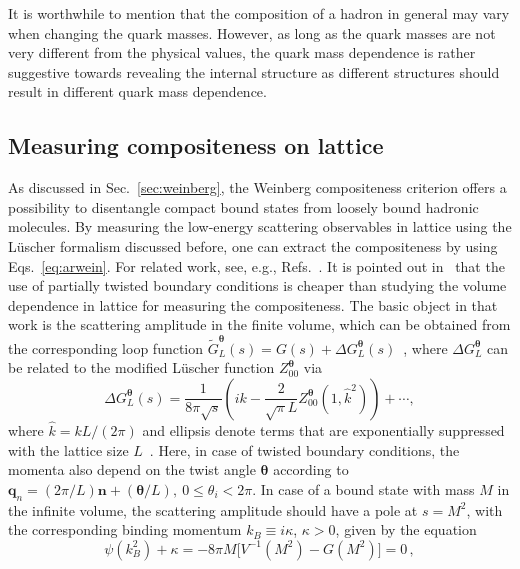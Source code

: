 {It is worthwhile to mention that the composition of a hadron in general
may vary when changing the quark masses. However, as long as the quark masses are
not very different from the physical values, the quark mass dependence is rather
suggestive towards revealing the internal structure as different structures
should result in different quark mass dependence. }

\subsection{Measuring compositeness on lattice}
\label{sec:compo}

As discussed in Sec.~\ref{sec:weinberg}, the Weinberg compositeness criterion
offers a possibility to disentangle compact bound states from loosely bound
hadronic molecules. {By measuring the low-energy scattering observables in
lattice using the L\"uscher formalism discussed before, one can extract the
compositeness by using Eqs.~\eqref{eq:arwein}. For related work, see, e.g.,
Refs.~\cite{Suganuma:2007uv,MartinezTorres:2011pr,Ozaki:2012ce,
Albaladejo:2013aka}. It is pointed out in~\cite{Agadjanov:2014ana} that the use
of partially twisted boundary conditions is cheaper than studying the volume dependence in lattice
for measuring the compositeness.} 
The basic object in that work is the
scattering amplitude in the finite volume, which can be obtained from the
corresponding loop function $\tilde G_L^{\bm{\theta}}(s) = G(s)+\Delta
G_L^{\bm{\theta}}(s)$~\cite{Doring:2011vk}, where $\Delta G_L^{\bm{\theta}}$ can
be related to the modified L\"uscher function $Z_{00}^{\bm{\theta}}$ via
\begin{equation}
  \label{deltaG-luscher1}
  \Delta G_L^{\bm{\theta}}(s)=\frac1{8\pi\sqrt{s}}\left(
    ik - \frac{2}{\sqrt{\pi}L} Z_{00}^{\bm{\theta}}(1,\hat k^2)
  \right)+\cdots,
\end{equation}
where $\hat k = kL/(2\pi)$ and ellipsis denote terms that are exponentially
suppressed with the lattice size $L$~\cite{Doring:2011vk}. Here, in case 
of twisted boundary conditions, the momenta also depend on the twist angle
$\bm{\theta}$ according to 
$\bm{q}_n=(2\pi/L)\bm{n}+(\bm{\theta}/L),~0\leq\theta_i<2\pi$. 
In case of a bound state with mass $M$ in the infinite volume, the 
scattering amplitude should have a pole at $s=M^2$, with the corresponding 
binding momentum $k_B\equiv i\kappa$, $\kappa>0$, given by the equation
\begin{equation}
  \label{inf-vol-pole-eq}
  \psi(k_B^2)+\kappa = -8\pi M\Big[V^{-1}(M^2) - G(M^2)\Big] = 0\,,
\end{equation}
